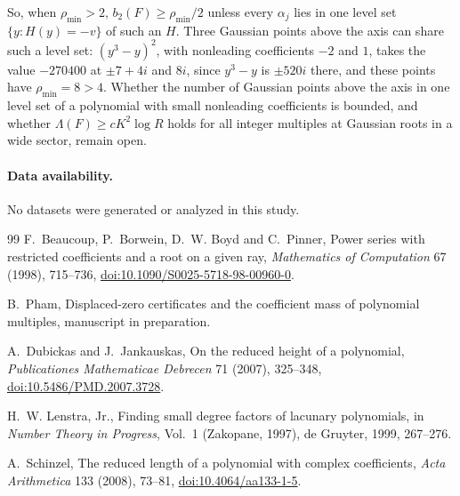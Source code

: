 \documentclass[11pt]{article}
\begin{document}
So, when $\rho_{\min}>2$, $b_2(F)\ge\rho_{\min}/2$ unless every $\alpha_j$
lies in one level set $\{y:H(y)=-v\}$ of such an $H$.  Three Gaussian points
above the axis can share such a level set: $(y^3-y)^2$, with nonleading
coefficients $-2$ and $1$, takes the value $-270400$ at $\pm7+4i$ and $8i$,
since $y^3-y$ is $\pm520i$ there, and these points have
$\rho_{\min}=8>4$.  Whether the number of Gaussian points above the
axis in one level set
of a polynomial with small nonleading coefficients is bounded, and whether
$\Lambda(F)\ge cK^2\log R$ holds for all integer multiples at Gaussian roots in
a wide sector, remain open.

\paragraph{Data availability.}
No datasets were generated or analyzed in this study.

\begin{thebibliography}{99}
\small
{}
F.~Beaucoup, P.~Borwein, D.~W. Boyd and C.~Pinner,
\newblock Power series with restricted coefficients and a root on a given ray,
\newblock \emph{Mathematics of Computation} 67 (1998), 715--736,
\newblock \href{https://doi.org/10.1090/S0025-5718-98-00960-0}
{doi:10.1090/S0025-5718-98-00960-0}.

B.~Pham,
\newblock Displaced-zero certificates and the coefficient mass of polynomial
multiples,
\newblock manuscript in preparation.

A.~Dubickas and J.~Jankauskas,
\newblock On the reduced height of a polynomial,
\newblock \emph{Publicationes Mathematicae Debrecen} 71 (2007), 325--348,
\newblock \href{https://doi.org/10.5486/PMD.2007.3728}
{doi:10.5486/PMD.2007.3728}.

H.~W. Lenstra, Jr.,
\newblock Finding small degree factors of lacunary polynomials,
\newblock in \emph{Number Theory in Progress}, Vol.~1 (Zakopane, 1997),
de Gruyter, 1999, 267--276.

A.~Schinzel,
\newblock The reduced length of a polynomial with complex coefficients,
\newblock \emph{Acta Arithmetica} 133 (2008), 73--81,
\newblock \href{https://doi.org/10.4064/aa133-1-5}
{doi:10.4064/aa133-1-5}.
\end{thebibliography}
\end{document}
